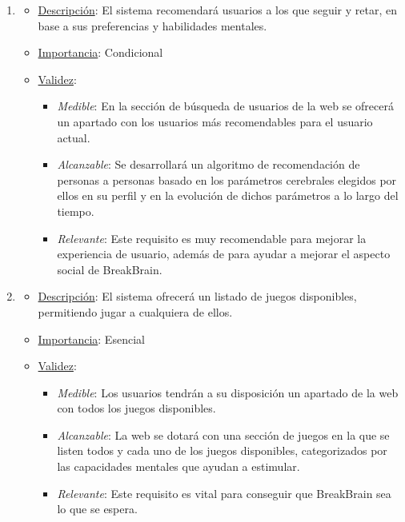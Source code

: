 \begin{enumerate}
\item %
  \begin{itemize}
  \item \underline{Descripción}: El sistema recomendará usuarios a los que seguir y retar, en base a sus preferencias y habilidades mentales.
  \item \underline{Importancia}: Condicional
  \item \underline{Validez}:
    \begin{itemize}
    \item \textit{Medible}: En la sección de búsqueda de usuarios de la web se ofrecerá un apartado con los usuarios más recomendables para el usuario actual.
    \item \textit{Alcanzable}: Se desarrollará un algoritmo de recomendación de personas a personas basado en los parámetros cerebrales elegidos por ellos en su perfil y en la evolución de dichos parámetros a lo largo del tiempo.
    \item \textit{Relevante}: Este requisito es muy recomendable para mejorar la experiencia de usuario, además de para ayudar a mejorar el aspecto social de BreakBrain.
    \end{itemize}
  \end{itemize}

\item %
  \begin{itemize}
  \item \underline{Descripción}: El sistema ofrecerá un listado de juegos disponibles, permitiendo jugar a cualquiera de ellos.
  \item \underline{Importancia}: Esencial
  \item \underline{Validez}:
    \begin{itemize}
    \item \textit{Medible}: Los usuarios tendrán a su disposición un apartado de la web con todos los juegos disponibles.
    \item \textit{Alcanzable}: La web se dotará con una sección de juegos en la que se listen todos y cada uno de los juegos disponibles, categorizados por las capacidades mentales que ayudan a estimular.
    \item \textit{Relevante}: Este requisito es vital para conseguir que BreakBrain sea lo que se espera.
    \end{itemize}
  \end{itemize}


\end{enumerate}
